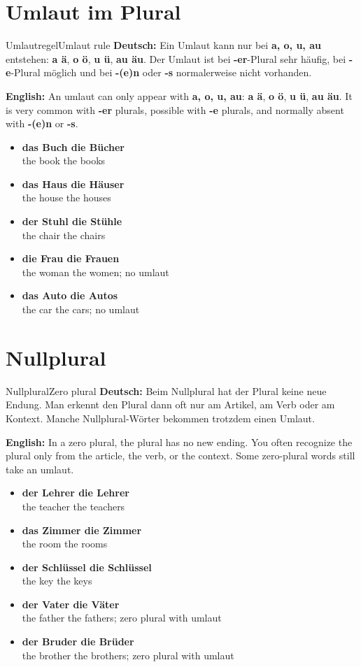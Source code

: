 \documentclass[a4paper,11pt]{article}
\newcommand{\GermanText}[1]{\textbf{Deutsch: }#1\par}
\newcommand{\EnglishText}[1]{{\small\color{SoftGray}\textbf{English: }#1\par}}
\newcommand{\ExampleItem}[2]{\item \textbf{#1}\\{\small\color{SoftGray}#2}}
\begin{document}
\section{Umlaut im Plural}

\begin{grammarentry}{Umlautregel}{Umlaut rule}
\GermanText{Ein Umlaut kann nur bei \textbf{a, o, u, au} entstehen: \textbf{a \textrightarrow{} ä}, \textbf{o \textrightarrow{} ö}, \textbf{u \textrightarrow{} ü}, \textbf{au \textrightarrow{} äu}. Der Umlaut ist bei \textbf{-er}-Plural sehr häufig, bei \textbf{-e}-Plural möglich und bei \textbf{-(e)n} oder \textbf{-s} normalerweise nicht vorhanden.}
\EnglishText{An umlaut can only appear with \textbf{a, o, u, au}: \textbf{a \textrightarrow{} ä}, \textbf{o \textrightarrow{} ö}, \textbf{u \textrightarrow{} ü}, \textbf{au \textrightarrow{} äu}. It is very common with \textbf{-er} plurals, possible with \textbf{-e} plurals, and normally absent with \textbf{-(e)n} or \textbf{-s}.}
\begin{exbox}
\begin{itemize}
\ExampleItem{das Buch \textrightarrow{} die Bücher}{the book \textrightarrow{} the books}
\ExampleItem{das Haus \textrightarrow{} die Häuser}{the house \textrightarrow{} the houses}
\ExampleItem{der Stuhl \textrightarrow{} die Stühle}{the chair \textrightarrow{} the chairs}
\ExampleItem{die Frau \textrightarrow{} die Frauen}{the woman \textrightarrow{} the women; no umlaut}
\ExampleItem{das Auto \textrightarrow{} die Autos}{the car \textrightarrow{} the cars; no umlaut}
\end{itemize}
\end{exbox}
\end{grammarentry}

\section{Nullplural}

\begin{grammarentry}{Nullplural}{Zero plural}
\GermanText{Beim Nullplural hat der Plural keine neue Endung. Man erkennt den Plural dann oft nur am Artikel, am Verb oder am Kontext. Manche Nullplural-Wörter bekommen trotzdem einen Umlaut.}
\EnglishText{In a zero plural, the plural has no new ending. You often recognize the plural only from the article, the verb, or the context. Some zero-plural words still take an umlaut.}
\begin{exbox}
\begin{itemize}
\ExampleItem{der Lehrer \textrightarrow{} die Lehrer}{the teacher \textrightarrow{} the teachers}
\ExampleItem{das Zimmer \textrightarrow{} die Zimmer}{the room \textrightarrow{} the rooms}
\ExampleItem{der Schlüssel \textrightarrow{} die Schlüssel}{the key \textrightarrow{} the keys}
\ExampleItem{der Vater \textrightarrow{} die Väter}{the father \textrightarrow{} the fathers; zero plural with umlaut}
\ExampleItem{der Bruder \textrightarrow{} die Brüder}{the brother \textrightarrow{} the brothers; zero plural with umlaut}
\end{itemize}
\end{exbox}
\end{grammarentry}
\end{document}
